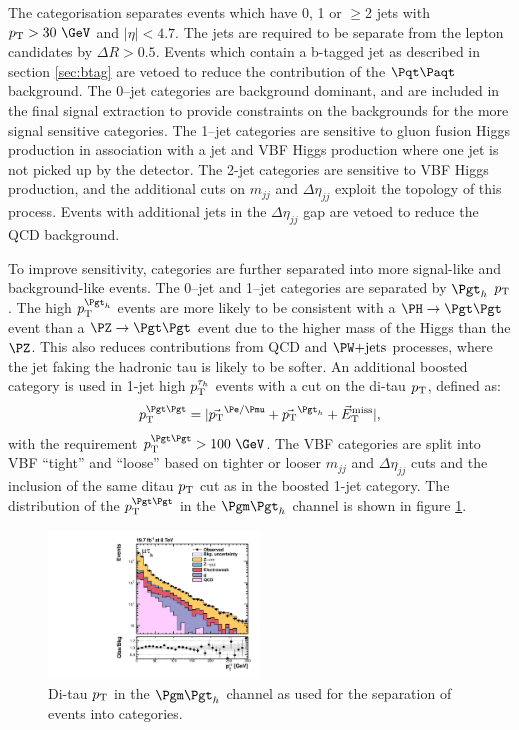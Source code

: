 The categorisation separates events which have 0, 1 or $\geq$2 jets with $\pt > 30~\GeV$
and $|\eta| < 4.7$. The jets are required to be separate from the lepton
candidates by $\Delta R > 0.5$. Events which contain a b-tagged jet as described in section
\ref{sec:btag} are vetoed to reduce the contribution of the $\ttbar$ background. 
The 0--jet categories are background dominant, and are included in the final
signal extraction to provide constraints on the backgrounds for the more signal
sensitive categories. The 1--jet categories are sensitive to gluon fusion Higgs
production in association with a jet and \ac{VBF} Higgs production where one jet is
not picked up by the detector. The 2-jet categories are sensitive to
\ac{VBF} Higgs production, and the additional cuts on $m_{jj}$ and $\Delta
\eta_{jj}$ exploit the topology of this process. Events with additional jets in
the $\Delta \eta_{jj}$ gap are vetoed to reduce the \ac{QCD} background.

To improve sensitivity, categories are further separated into more signal-like
and background-like events. The 0--jet and 1--jet categories are separated by
$\Pgth$ $p_{\mathrm{T}}$. The high $\pt^{\Pgth}$ events are more likely to be
consistent with a $\HToTauTau$ event than a $\ZToTauTau$ event due to the higher
mass of the Higgs than the $\PZ$. This also reduces contributions from \ac{QCD}
and $\WJets$ processes, where the jet faking the hadronic tau is likely to be
softer. An additional boosted category is used in 1-jet high $p_{\mathrm{T}}^{\tau_{h}}$
events with a cut on the di-tau $p_{\mathrm{T}}$, defined as:
\begin{equation}
\pt^{\Pgt\Pgt} = |\vec{\pt}^{\Pe/\Pmu} + \vec{\pt}^{\Pgth}+\vecMET|,
\end{equation}
with the requirement $\pt^{\Pgt\Pgt}>100~\GeV$. The VBF categories are split into VBF
``tight'' and ``loose'' based on tighter or looser $m_{jj}$ and
$\Delta\eta_{jj}$ cuts and the inclusion of the same ditau $p_{\mathrm{T}}$ cut as in the
boosted 1-jet category. The distribution of the $\pt^{\Pgt\Pgt}$ in the
$\mutau$ channel is shown in figure \ref{fig:ditaupt}. 

\begin{figure}[htb]
\begin{center}
    \includegraphics[width=0.5\textwidth]
      {plots/htt-sm/pt_tt_inclusive_mt_2012_log.pdf}
\end{center}
\caption{
 Di-tau $p_{\mathrm{T}}$ in the $\mutau$ channel as used for the separation of events into
 categories. 
}
\label{fig:ditaupt}
\end{figure}

